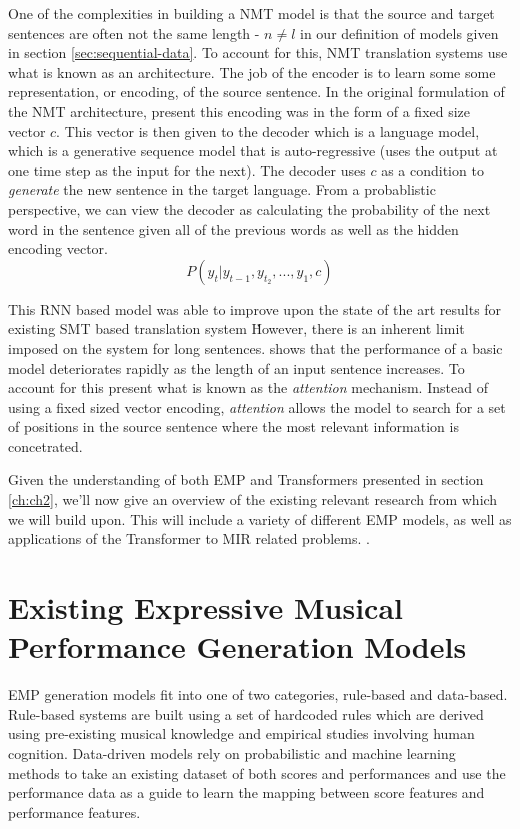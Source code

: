 One of the complexities in building a NMT model is that the source and target sentences are often not the same length - $n \neq l$ in our definition of \seq{} models given in section \ref{sec:sequential-data}. To account for this, NMT translation systems use what is known as an \ed{} architecture. The job of the encoder is to learn some some representation, or encoding, of the source sentence. In the original formulation of the \ed{} NMT architecture, \citet{cho2014learning} present this encoding was in the form of a fixed size vector $c$. This vector is then given to the decoder which is a language model, which is a generative sequence model that is auto-regressive (uses the output at one time step as the input for the next). The decoder uses $c$ as a condition to \emph{generate} the new sentence in the target language. From a probablistic perspective, we can view the decoder as calculating the probability of the next word in the sentence given all of the previous words as well as the hidden encoding vector. $$P(y_t \vert y_{t-1}, y_{t_2}, ..., y_1, c)$$

\newcommand{\at}[1]{\emph{#1}}

This RNN based \ed{} model was able to improve upon the state of the art results for existing SMT based translation system \. However, there is an inherent limit imposed on the system for long sentences. \citet{cho2014learning} shows that the performance of a basic \ed{} model deteriorates rapidly as the length of an input sentence increases. To account for this 
\citet{bahdanau2014neural} present what is known as the \at{attention} mechanism. Instead of using a fixed sized vector encoding, \at{attention} allows the model to search for a set of positions in the source sentence where the most relevant information is concetrated. 





Given the understanding of both EMP and Transformers presented in section \ref{ch:ch2}, we'll  now give an overview of the existing relevant research from which we will build upon. This will include a variety of different EMP models, as well as applications of the Transformer to MIR related problems. . 

\section{Existing Expressive Musical Performance Generation Models}
EMP generation models fit into one of two categories, rule-based and data-based. Rule-based systems are built using a set of hardcoded rules which are derived using pre-existing musical knowledge and empirical studies involving human cognition. Data-driven models rely on probabilistic and machine learning methods to take an existing dataset of both scores and performances and use the performance data as a guide to learn the mapping between score features and performance features. 

